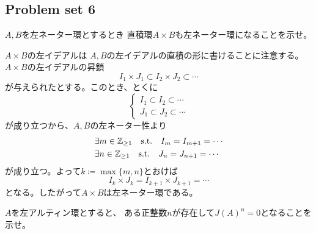 \documentclass[report]{jlreq}
\begin{document}
\subsection{Problem set 6}

\begin{problem}[代数学II 6.79]
    $A, B$を左ネーター環とするとき
    直積環$A \times B$も左ネーター環になることを示せ。
\end{problem}

\begin{answer}
    $A \times B$の左イデアルは
    $A, B$の左イデアルの直積の形に書けることに注意する。
    $A \times B$の左イデアルの昇鎖
    \begin{equation}
        I_1 \times J_1 \subset I_2 \times J_2 \subset \cdots
    \end{equation}
    が与えられたとする。このとき、とくに
    \begin{equation}
        \begin{cases}
            I_1 \subset I_2 \subset \cdots \\
            J_1 \subset J_2 \subset \cdots
        \end{cases}
    \end{equation}
    が成り立つから、$A, B$の左ネーター性より
    \begin{align}
        &\exists m \in \mathbb{Z}_{\ge 1}
            \quad \text{s.t.} \quad
            I_m = I_{m + 1} = \cdots \\
        &\exists n \in \mathbb{Z}_{\ge 1}
            \quad \text{s.t.} \quad
            J_n = J_{n + 1} = \cdots
    \end{align}
    が成り立つ。よって$k \coloneqq \max\{m, n\}$とおけば
    \begin{equation}
        I_k \times J_k = I_{k + 1} \times J_{k + 1} = \cdots
    \end{equation}
    となる。したがって$A \times B$は左ネーター環である。
\end{answer}

\begin{problem}[代数学II 6.82]
    $A$を左アルティン環とすると、
    ある正整数$n$が存在して$J(A)^n = 0$となることを示せ。
\end{problem}
\end{document}
